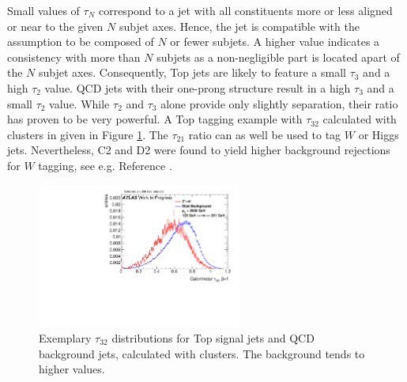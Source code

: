 Small values of $\tau_N$ correspond to a jet with all constituents more or less aligned or near to the given $N$ subjet axes. Hence, the jet is compatible with the assumption to be composed of $N$ or fewer subjets. A higher value indicates a consistency with more than $N$ subjets as a non-negligible part is located apart of the $N$ subjet axes. Consequently, Top jets are likely to feature a small $\tau_3$ and a high $\tau_2$ value. QCD jets with their one-prong structure result in a high $\tau_{3}$ and a small $\tau_{2}$ value. While $\tau_2$ and $\tau_3$ alone provide only slightly separation, their ratio has proven to be very powerful. A Top tagging example with $\tau_{32}$ calculated with clusters in given in Figure \ref{fig:nSub_example}. The $\tau_{21}$ ratio can as well be used to tag $W$ or Higgs jets. Nevertheless, C2 and D2 were found to yield higher background rejections for $W$ tagging, see e.g. Reference \cite{bib:w_tagging}. 
\begin{figure}
\centering
\includegraphics[width=0.6\textwidth]{sascha_input/plots/Top/Beta1/h_recoJet_nSub32_bin6.pdf}
\caption{Exemplary $\tau_{32}$ distributions for Top signal jets and QCD background jets, calculated with clusters. The background tends to higher values.}\label{fig:nSub_example}
\end{figure}

